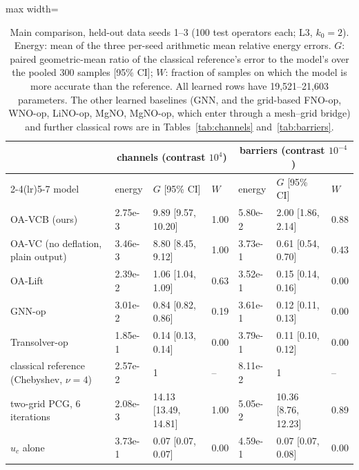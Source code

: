 \begin{table}[tbp]\centering\footnotesize\setlength{\tabcolsep}{4pt}
\caption{Main comparison, held-out data seeds 1--3 (100 test operators each; L3, $k_0=2$). Energy: mean of the three per-seed arithmetic mean relative energy errors. $G$: paired geometric-mean ratio of the classical reference's error to the model's over the pooled 300 samples [95\% CI]; $W$: fraction of samples on which the model is more accurate than the reference. All learned rows have 19{,}521--21{,}603 parameters. The other learned baselines (GNN, and the grid-based FNO-op, WNO-op, LiNO-op, MgNO, MgNO-op, which enter through a mesh--grid bridge) and further classical rows are in Tables~\ref{tab:channels} and~\ref{tab:barriers}.}\label{tab:core}
\begin{adjustbox}{max width=\linewidth}
\begin{tabular}{lllllll}\toprule
 & \multicolumn{3}{c}{channels (contrast $10^4$)} & \multicolumn{3}{c}{barriers (contrast $10^{-4}$)} \\ \cmidrule(lr){2-4}\cmidrule(lr){5-7}
model & energy & $G$ [95\% CI] & $W$ & energy & $G$ [95\% CI] & $W$ \\\midrule
OA-VCB (ours) & 2.75e-3 & 9.89 [9.57, 10.20] & 1.00 & 5.80e-2 & 2.00 [1.86, 2.14] & 0.88 \\
OA-VC (no deflation, plain output) & 3.46e-3 & 8.80 [8.45, 9.12] & 1.00 & 3.73e-1 & 0.61 [0.54, 0.70] & 0.43 \\
OA-Lift & 2.39e-2 & 1.06 [1.04, 1.09] & 0.63 & 3.52e-1 & 0.15 [0.14, 0.16] & 0.00 \\
GNN-op & 3.01e-2 & 0.84 [0.82, 0.86] & 0.19 & 3.61e-1 & 0.12 [0.11, 0.13] & 0.00 \\
Transolver-op & 1.85e-1 & 0.14 [0.13, 0.14] & 0.00 & 3.79e-1 & 0.11 [0.10, 0.12] & 0.00 \\
\midrule
classical reference (Chebyshev, $\nu=4$) & 2.57e-2 & 1 & -- & 8.11e-2 & 1 & -- \\
two-grid PCG, 6 iterations & 2.08e-3 & 14.13 [13.49, 14.81] & 1.00 & 5.05e-2 & 10.36 [8.76, 12.23] & 0.89 \\
$u_c$ alone & 3.73e-1 & 0.07 [0.07, 0.07] & 0.00 & 4.59e-1 & 0.07 [0.07, 0.08] & 0.00 \\
\bottomrule\end{tabular}
\end{adjustbox}
\end{table}
